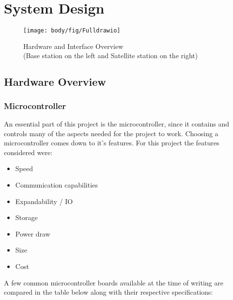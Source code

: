 \chapter{System Design}



\begin{figure}[!htb]
	\centering
	\texttt{[image: body/fig/Fulldrawio]}
	\caption{Hardware and Interface Overview \\(Base station on the left and Satellite station on the right) }
	\label{fig:fulldrawio}
\end{figure}

\section{Hardware Overview}
\subsection{Microcontroller}
An essential part of this project is the microcontroller, since it contains and controls many of the aspects needed for the project to work.
Choosing a microcontroller comes down to it's features. For this project the features considered were:
\begin{itemize}
	\item Speed
	\item Communication capabilities
	\item Expandability / IO
	\item Storage
	\item Power draw
	\item Size
	\item Cost
\end{itemize}

\noindent
A few common microcontroller boards available at the time of writing are compared in the table below along with their respective specifications:



